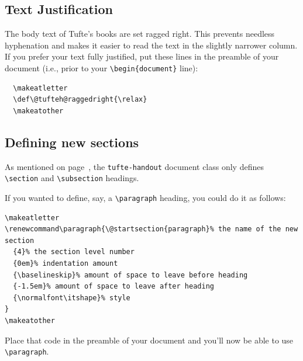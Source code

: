 \documentclass[twoside]{tufte-handout}
\begin{document}
\subsection{Text Justification}\label{sec:justification}
The body text of Tufte's books are set ragged right.  This prevents
needless hyphenation and makes it easier to read the text in the slightly
narrower column.  If you prefer your text fully justified, put these lines
in the preamble of your document (i.e., prior to your
\Verb|\begin{document}| line):

\begin{Verbatim}
  \makeatletter
  \def\@tufteh@raggedright{\relax}
  \makeatother 
\end{Verbatim}

\subsection{Defining new sections}\label{sec:defining-sections}
As mentioned on page~\pageref{sec:headings}, the \Verb|tufte-handout|
document class only defines \Verb|\section| and \Verb|\subsection|
headings.  

If you wanted to define, say, a \Verb|\paragraph| heading, you could do it
as follows:

\begin{Verbatim}
\makeatletter
\renewcommand\paragraph{\@startsection{paragraph}% the name of the new section
  {4}% the section level number
  {0em}% indentation amount
  {\baselineskip}% amount of space to leave before heading
  {-1.5em}% amount of space to leave after heading
  {\normalfont\itshape}% style
}
\makeatother
\end{Verbatim}

Place that code in the preamble of your document and you'll now be able to use
\Verb|\paragraph|.  


\end{document}
\end{document}
